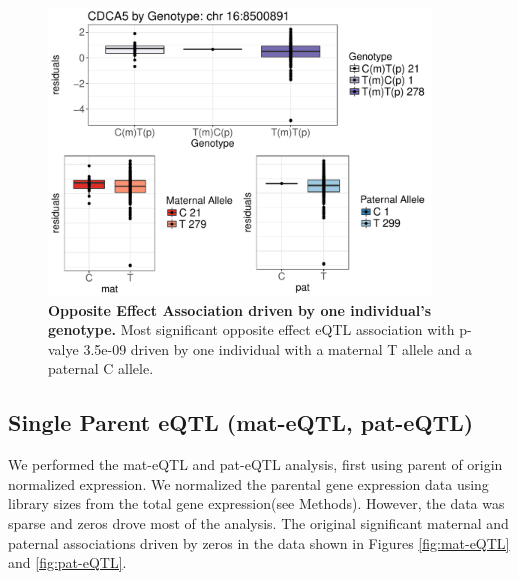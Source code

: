 \begin{figure}[!htb]
\centering \includegraphics[width=4in]{img/ch04/fig-03-oeQTL.pdf}
\caption[Opposite Effect Association driven by one individual's genotype.]{\textbf{Opposite Effect Association driven by one individual's genotype.} Most significant opposite effect eQTL association with p-valye 3.5e-09 driven by one individual with a maternal T allele and a paternal C allele.}
\label{fig:oeQTL3}
\end{figure}



\subsection{Single Parent eQTL (mat-eQTL, pat-eQTL)}\label{Single Parent eQTL (mat-eQTL, pat-eQTL)} 
We performed the mat-eQTL and pat-eQTL analysis, first using parent of origin normalized expression. We normalized the parental gene expression data using library sizes from the total gene expression(see Methods). However, the data was sparse and zeros drove most of the analysis. The original significant maternal and paternal associations driven by zeros in the data shown in Figures \ref{fig:mat-eQTL} and \ref{fig:pat-eQTL}. 

